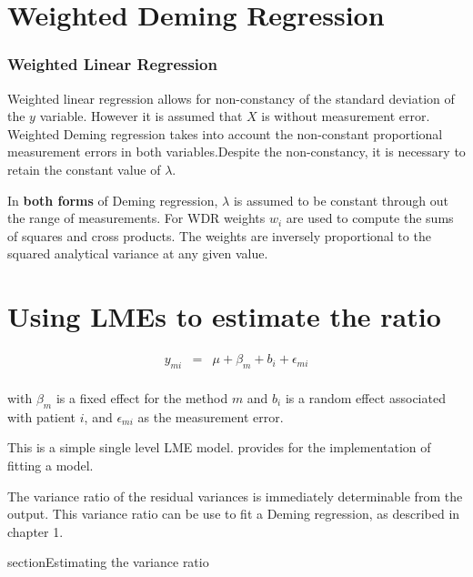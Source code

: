 \documentclass[12pt, a4paper]{report}
\theoremstyle{plain}
\theoremstyle{definition}
\theoremstyle{remark}
\begin{document}
\section{Weighted Deming Regression}
\subsubsection{Weighted Linear Regression}
Weighted linear regression allows for non-constancy of the standard deviation of the $y$ variable. However it is assumed that $X$ is without measurement error. Weighted Deming regression takes into account the non-constant proportional measurement errors in both variables.Despite the non-constancy, it is necessary to retain the constant value of $\lambda$.

In \textbf{both forms} of Deming regression, $\lambda$ is assumed to be constant through out the range of measurements. For WDR weights $w_{i}$ are used to compute the sums of squares and cross products. The weights are inversely proportional to the squared analytical variance at any given value.





\section{Using LMEs to estimate the ratio}

\begin{eqnarray*}
	y_{mi} &=& \mu + \beta_{m} + b_{i} + \epsilon_{mi}\\
\end{eqnarray*}

with $\beta_{m}$ is a fixed effect for the method $m$ and $b_{i}$
is a random effect associated with patient $i$, and
$\epsilon_{mi}$ as the measurement error.

This is a simple single level LME model. \citet{pb} provides for
the implementation of fitting a model.

The variance ratio of the residual variances is immediately
determinable from the output. This variance ratio can be use to
fit a Deming regression, as described in chapter 1.


\newpage
section{Estimating the variance ratio}


\end{document}
